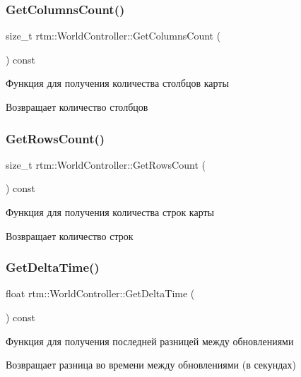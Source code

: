\subsubsection{\texorpdfstring{Get\+Columns\+Count()}{GetColumnsCount()}}
{\footnotesize\ttfamily size\+\_\+t rtm\+::\+World\+Controller\+::\+Get\+Columns\+Count (\begin{DoxyParamCaption}{ }\end{DoxyParamCaption}) const}

Функция для получения количества столбцов карты \begin{DoxyReturn}{Возвращает}
количество столбцов 
\end{DoxyReturn}
\mbox{\label{classrtm_1_1_world_controller_afb245167ac0680db01a3d09f80051dd0}} 
\subsubsection{\texorpdfstring{Get\+Rows\+Count()}{GetRowsCount()}}
{\footnotesize\ttfamily size\+\_\+t rtm\+::\+World\+Controller\+::\+Get\+Rows\+Count (\begin{DoxyParamCaption}{ }\end{DoxyParamCaption}) const}

Функция для получения количества строк карты \begin{DoxyReturn}{Возвращает}
количество строк 
\end{DoxyReturn}
\mbox{\label{classrtm_1_1_world_controller_a2288dd191a28070d4811897281413c36}} 
\subsubsection{\texorpdfstring{Get\+Delta\+Time()}{GetDeltaTime()}}
{\footnotesize\ttfamily float rtm\+::\+World\+Controller\+::\+Get\+Delta\+Time (\begin{DoxyParamCaption}{ }\end{DoxyParamCaption}) const}

Функция для получения последней разницей между обновлениями \begin{DoxyReturn}{Возвращает}
разница во времени между обновлениями (в секундах) 
\end{DoxyReturn}
\mbox{\label{classrtm_1_1_world_controller_a97ccb5133bc7c0617affe4d947265370}} 
